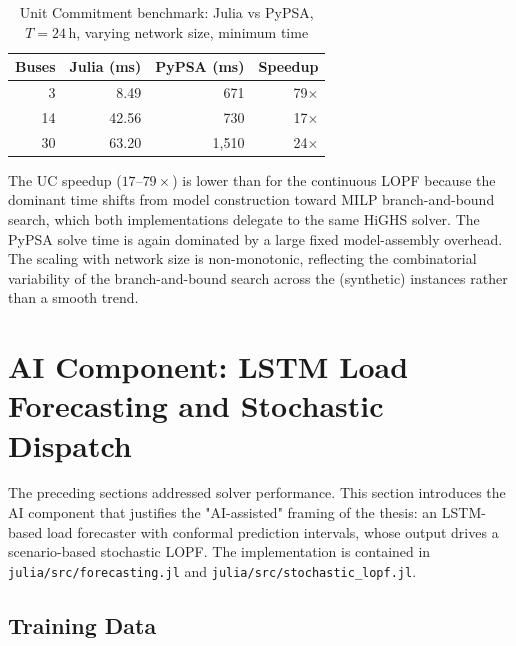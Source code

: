 \begin{table}[H]
\centering
\caption{Unit Commitment benchmark: Julia vs PyPSA, $T=24$\,h, varying network size, minimum time}
\label{tab:uc_benchmark_scale}
\begin{tabular}{rrrr}
\toprule
\textbf{Buses} & \textbf{Julia (ms)} & \textbf{PyPSA (ms)} & \textbf{Speedup} \\
\midrule
  3 &   8.49 &   671 & 79$\times$ \\
 14 &  42.56 &   730 & 17$\times$ \\
 30 &  63.20 & 1{,}510 & 24$\times$ \\
\bottomrule
\end{tabular}
\end{table}

The UC speedup ($17$--$79\times$) is lower than for the continuous LOPF because the dominant time shifts from model construction toward MILP branch-and-bound search, which both implementations delegate to the same HiGHS solver. The PyPSA solve time is again dominated by a large fixed model-assembly overhead. The scaling with network size is non-monotonic, reflecting the combinatorial variability of the branch-and-bound search across the (synthetic) instances rather than a smooth trend.


\section{AI Component: LSTM Load Forecasting and Stochastic Dispatch}
\label{sec:ai_component}

The preceding sections addressed solver performance. This section introduces the AI component that justifies the "AI-assisted" framing of the thesis: an LSTM-based load forecaster with conformal prediction intervals, whose output drives a scenario-based stochastic LOPF. The implementation is contained in \texttt{julia/src/forecasting.jl} and \texttt{julia/src/stochastic\_lopf.jl}.

\subsection{Training Data}

